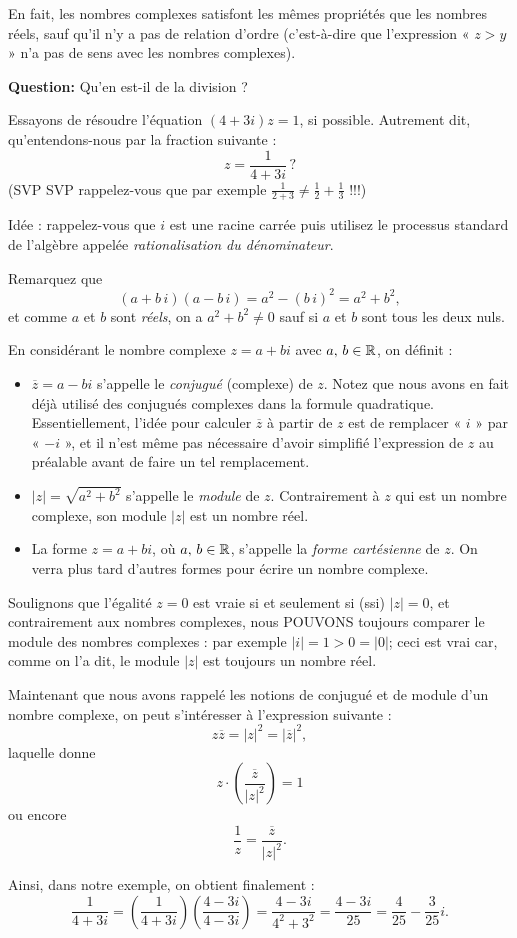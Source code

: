 En fait, les nombres complexes satisfont les mêmes propriétés 
que les nombres réels, sauf qu'il n'y a pas de relation d'ordre (c'est-à-dire que l'expression « $z>y$ » n'a pas de sens avec les nombres complexes).

{\bf Question:} Qu'en est-il de la division ?

\begin{myexample}
Essayons de résoudre l'équation $(4+3i)z = 1$, si possible. Autrement dit, qu'entendons-nous par la fraction suivante : 
$$
z = \frac{1}{4+3i} \,?
$$
(SVP SVP rappelez-vous que par exemple $\frac{1}{2+3} \neq \frac12 + \frac13$ !!!)


\begin{mysol}
Idée : rappelez-vous que $i$ est une racine carrée puis utilisez le processus standard de l'algèbre appelée \emph{rationalisation du dénominateur}.

Remarquez que
 $$(a+b \, i)(a-b\, i) = a^2-(b\, i)^2 = a^2+b^2,$$ et comme $a$ et $b$ sont \emph{réels}, on a $a^2+ b^2 \neq 0$
sauf si $a$ et $b$ sont tous les deux nuls.

En considérant le nombre complexe $z=a+bi$ avec $a,\, b\in\mathbb{R}$, on définit :
\begin{itemize}
\item $\overline{z} = a-bi$ s'appelle le \emph{conjugué} (complexe) de $z$. Notez que nous avons en fait déjà utilisé des conjugués complexes dans la formule quadratique. Essentiellement, l'idée pour calculer $\overline{z}$ à partir de $z$ est de remplacer « $ i $ » par « $ -i $ », et il n'est même pas nécessaire d'avoir simplifié l'expression de $z$ au préalable avant de faire un tel remplacement.
\item $| z | = \sqrt{a^2+b^2}$ s'appelle le \emph{module} de $z$. Contrairement à $z$ qui est un nombre complexe, son module $|z|$ est un nombre réel.
\item La forme $z=a+bi$, où $a,\, b\in\mathbb{R}$, s'appelle la \emph{forme cartésienne} de $z$. On verra plus tard d'autres formes pour écrire un nombre complexe.
\end{itemize}

Soulignons que l'égalité
$z = 0$ est vraie si et seulement si (ssi) $\vert z \vert = 0$, et contrairement aux nombres complexes, nous POUVONS toujours
comparer le module des nombres complexes : par exemple $\vert i \vert =  1 > 0 =  \vert 0 \vert$; ceci est vrai car, comme on l'a dit, le module $|z|$ est toujours un nombre réel.

Maintenant que nous avons rappelé les notions de conjugué et de module d'un nombre complexe, on peut s'intéresser à l'expression suivante :
$$
z \overline{z} = \vert z \vert^2 = \vert \overline{z} \vert^2,
$$
laquelle donne
$$
z \cdot \left(\frac{\overline{z}}{\vert z \vert^2}\right) = 1
$$
ou encore
$$
\frac{1}{z} = \frac{\overline{z}}{\vert z \vert^2}.
$$

Ainsi, dans notre exemple, on obtient finalement :
$$
\frac{1}{4+3i} = \left(\frac{1}{4+3i} \right) \left( \frac{4-3i}{4-3i} \right) = \frac{4-3i}{4^2+3^2} = \frac{4-3i}{25} = \frac{4}{25} - \frac{3}{25}i.
$$
\end{mysol}
\end{myexample}

